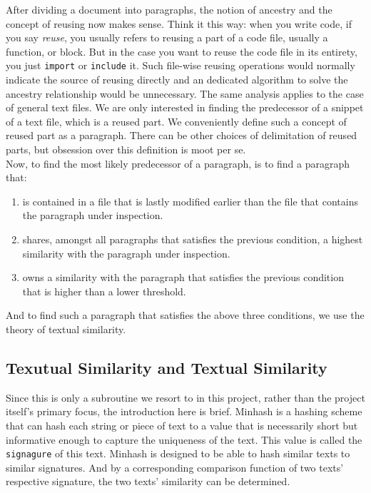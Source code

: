 \documentclass{article}
\begin{document}
After dividing a document into paragraphs, the notion of ancestry and the concept of reusing now makes sense. Think it this way: when you write code, if you say \textit{reuse}, you usually refers to reusing a part of a code file, usually a function, or block. But in the case you want to reuse the code file in its entirety, you just \texttt{import} or \texttt{include} it. Such file-wise reusing operations would normally indicate the source of reusing directly and an dedicated algorithm to solve the ancestry relationship would be unnecessary. The same analysis applies to the case of general text files. We are only interested in finding the predecessor of a snippet of a text file, which is a reused part. We conveniently define such a concept of reused part as a paragraph. There can be other choices of delimitation of reused parts, but obsession over this definition is moot per se. \\

Now, to find the most likely predecessor of a paragraph, is to find a paragraph that:
\begin{enumerate}
  \item is contained in a file that is lastly modified earlier than the file that contains the paragraph under inspection.
  \item shares, amongst all paragraphs that satisfies the previous condition, a highest similarity with the paragraph under inspection.
  \item owns a similarity with the paragraph that satisfies the previous condition that is higher than a lower threshold.
\end{enumerate}
And to find such a paragraph that satisfies the above three conditions, we use the theory of textual similarity. \\

\subsection{Texutual Similarity and Textual Similarity}
Since this is only a subroutine we resort to in this project, rather than the project itself's primary focus, the introduction here is brief. Minhash is a hashing scheme that can hash each string or piece of text to a value that is necessarily short but informative enough to capture the uniqueness of the text. This value is called the \texttt{signagure} of this text. Minhash is designed to be able to hash similar texts to similar signatures. And by a corresponding comparison function of two texts' respective signature, the two texts' similarity can be determined.
\end{document}
